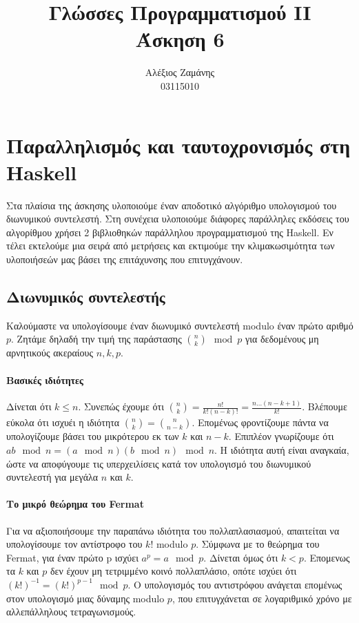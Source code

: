 \documentclass[titlepage]{article}
\begin{document}
\title{Γλώσσες Προγραμματισμού II\\
    Άσκηση 6}
\author{Αλέξιος Ζαμάνης\\
    03115010}

\maketitle

\section*{Παραλληλισμός και ταυτοχρονισμός στη Haskell}

Στα πλαίσια της άσκησης υλοποιούμε έναν αποδοτικό αλγόριθμο υπολογισμού του διωνυμικού συντελεστή. Στη συνέχεια υλοποιούμε διάφορες παράλληλες εκδόσεις του αλγορίθμου χρήσει 2 βιβλιοθηκών παράλληλου προγραμματισμού της Haskell. Εν τέλει εκτελούμε μια σειρά από μετρήσεις και εκτιμούμε την κλιμακωσιμότητα των υλοποιήσεών μας βάσει της επιτάχυνσης που επιτυγχάνουν.

\subsection*{Διωνυμικός συντελεστής}

Καλούμαστε να υπολογίσουμε έναν διωνυμικό συντελεστή modulo έναν πρώτο αριθμό $p$. Ζητάμε δηλαδή την τιμή της παράστασης ${n\choose k}\mod p$ για δεδομένους μη αρνητικούς ακεραίους $n, k, p$.

\paragraph{Βασικές ιδιότητες}

Δίνεται ότι $k\leq n$. Συνεπώς έχουμε ότι ${n\choose k}=\frac{n!}{k!(n-k)!}=\frac{n\dots(n-k+1)}{k!}$. Βλέπουμε εύκολα ότι ισχυέι η ιδιότητα ${n\choose k}={n\choose n-k}$. Επομένως φροντίζουμε πάντα να υπολογίζουμε βάσει του μικρότερου εκ των $k$ και $n-k$. Επιπλέον γνωρίζουμε ότι $ab\mod n=(a\mod n)(b\mod n)\mod n$. Η ιδιότητα αυτή είναι αναγκαία, ώστε να αποφύγουμε τις υπερχειλίσεις κατά τον υπολογισμό του διωνυμικού συντελεστή για μεγάλα $n$ και $k$.

\paragraph{Το μικρό θεώρημα του Fermat}

Για να αξιοποιήσουμε την παραπάνω ιδιότητα του πολλαπλασιασμού, απαιτείται να υπολογίσουμε τον αντίστροφο του $k!$ modulo $p$. Σύμφωνα με το θεώρημα του Fermat, για έναν πρώτο p ισχύει $a^p=a\mod p$. Δίνεται όμως ότι $k<p$. Επομενως τα $k$ και $p$ δεν έχουν μη τετριμμένο κοινό πολλαπλάσιο, οπότε ισχύει ότι $(k!)^{-1}=(k!)^{p-1}\mod p$. Ο υπολογισμός του αντιστρόφου ανάγεται επομένως στον υπολογισμό μιας δύναμης modulo $p$, που επιτυγχάνεται σε λογαριθμικό χρόνο με αλλεπάλληλους τετραγωνισμούς.
\end{document}
